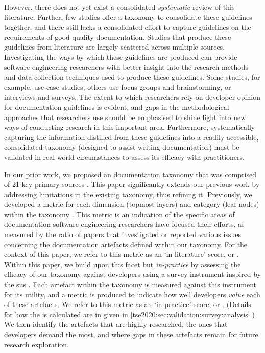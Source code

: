 However, there does not yet exist a consolidated \textit{systematic} review of this literature. Further, few studies offer a taxonomy to consolidate these guidelines together, and there still lacks a consolidated effort to capture guidelines on the requirements of good quality  documentation. Studies that produce these guidelines from literature are largely scattered across multiple sources. Investigating the ways by which these guidelines are produced can provide software engineering researchers with better insight into the research methods and data collection techniques used to produce these guidelines. Some studies, for example, use case studies, others use focus groups and brainstorming, or interviews and surveys. The extent to which researchers rely on developer opinion for  documentation guidelines is evident, and gaps in the methodological approaches that researchers use should be emphasised to shine light into new ways of conducting research in this important area. Furthermore, systematically capturing the information distilled from these guidelines into a readily accessible, consolidated taxonomy (designed to assist writing  documentation) must be validated in real-world circumstances to assess its efficacy with practitioners.

In our prior work, we proposed an  documentation taxonomy that was comprised of 21 key primary sources \citep{Cummaudo:2019esem}. This paper significantly extends our previous work by addressing limitations in the existing taxonomy, thus refining it. Previously, we developed a metric for each dimension (topmost-layers) and category (leaf nodes) within the taxonomy \citep{Cummaudo:2019esem}. This metric is an indication of the specific areas of  documentation software engineering researchers have focused their efforts, as measured by the ratio of papers that investigated or reported various issues concerning the documentation artefacts defined within our taxonomy. For the context of this paper, we refer to this metric as an `in-literature' score, or . Within this paper, we build upon this facet but \textit{in-practice} by assessing the efficacy of our taxonomy against developers using a survey instrument inspired by the \gls{sus} \citep{Brooke:1996ua}. Each artefact within the taxonomy is measured against this instrument for its utility, and a metric is produced to indicate how well developers \textit{value} each of these artefacts. We refer to this metric as an `in-practice' score, or . (Details for how the  is calculated are in given in \cref{tse2020:sec:validation:survey:analysis}.) We then identify the artefacts that are highly researched, the ones that developers demand the most, and where gaps in these artefacts remain for future research exploration.


